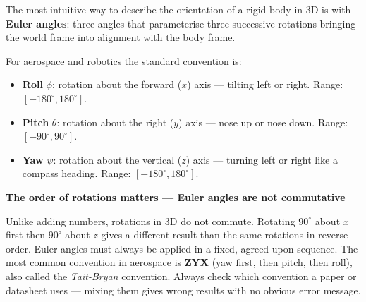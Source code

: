 \documentclass[12pt, a4paper]{article}
\begin{document}
The most intuitive way to describe the orientation of a rigid body in 3D is
with \textbf{Euler angles}: three angles that parameterise three successive
rotations bringing the world frame into alignment with the body frame.

For aerospace and robotics the standard convention is:
\begin{itemize}[leftmargin=1.4em, itemsep=3pt]
  \item \textbf{Roll} $\phi$: rotation about the forward ($x$) axis ---
    tilting left or right.
    Range: $[-180^\circ, 180^\circ]$.
  \item \textbf{Pitch} $\theta$: rotation about the right ($y$) axis ---
    nose up or nose down.
    Range: $[-90^\circ, 90^\circ]$.
  \item \textbf{Yaw} $\psi$: rotation about the vertical ($z$) axis ---
    turning left or right like a compass heading.
    Range: $[-180^\circ, 180^\circ]$.
\end{itemize}

\begin{notebox}
  \textbf{The order of rotations matters --- Euler angles are not commutative}

  Unlike adding numbers, rotations in 3D do not commute.
  Rotating $90^\circ$ about $x$ first then $90^\circ$ about $z$ gives a
  different result than the same rotations in reverse order.
  Euler angles must always be applied in a fixed, agreed-upon sequence.
  The most common convention in aerospace is \textbf{ZYX} (yaw first, then
  pitch, then roll), also called the \emph{Tait-Bryan} convention.
  Always check which convention a paper or datasheet uses --- mixing them
  gives wrong results with no obvious error message.
\end{notebox}
\end{document}
